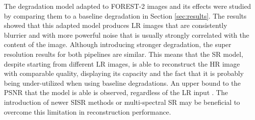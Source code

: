 



The degradation model adapted to FOREST-2 images and its effects were studied by comparing them to a baseline degradation in Section \ref{sec:results}. The results showed that this adapted model produces LR images that are consistently blurrier and with more powerful noise that is usually strongly correlated with the content of the image. Although introducing stronger degradation, the super resolution results for both pipelines are similar. This means that the SR model, despite starting from different LR images, is able to reconstruct the HR image with comparable quality, displaying its capacity and the fact that it is probably being under-utilized when using baseline degradations.  An upper bound to the PSNR that the model is able is  observed, regardless of the LR input . The introduction of newer SISR methods or multi-spectral SR may be beneficial to overcome this limitation in reconstruction performance.

